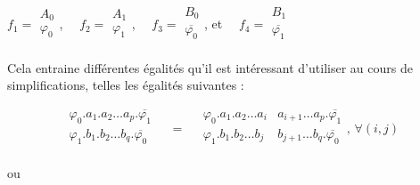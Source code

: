 \centerline { 
$ f_1 = \begin{array}{|c|} A_0 \\ \varphi_0 \\ \end{array}$, $\quad f_2 = \begin{array}{|c|} A_1 \\ \varphi_1 \\ \end{array}$, $\quad f_3 = \begin{array}{|c|} B_0 \\ \overline{\varphi_0} \\\end{array}$, et $\quad f_4 = \begin{array}{|c|} B_1 \\ \overline{\varphi_1} \\ \end{array} $   
}



Cela entraine différentes égalités qu'il est intéressant d'utiliser au cours de simplifications, telles les égalités suivantes :


 
 \[
 \begin{array}{|c|} 
 	\varphi_0 . a_1 . a_2 \ldots a_p . \overline{\varphi_1} \\
 	\varphi_1 . b_1 . b_2 \ldots b_q . \overline{\varphi_0} \\
 \end{array} 
      \quad = \quad \begin{array}{|c|c|} 
                        \varphi_0 . a_1 . a_2 \ldots a_i & a_{i+1} \ldots a_p . \overline{\varphi_1} \\ 
                        \varphi_1 . b_1 . b_2 \ldots b_j & b_{j+1} \ldots b_q . \overline{\varphi_0} \\ 
                    \end{array}\text{, } \forall (i, j) 
 \]
 
ou 



